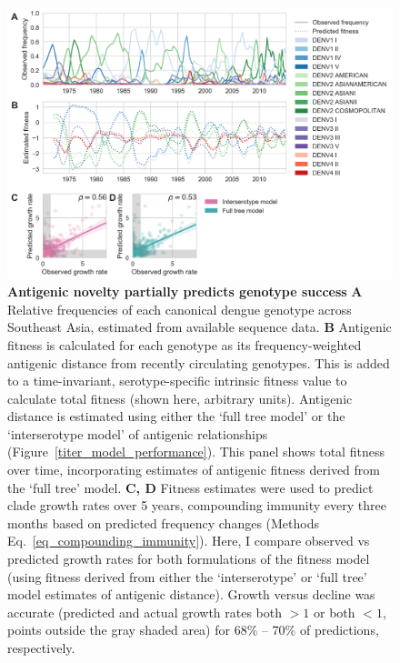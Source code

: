 \begin{figure}[ht!]
  \begin{centering}
\includegraphics[width=.9\linewidth]{./png/genotype-fitness.png}
    \caption[Antigenic novelty partially predicts genotype success]{\textbf{Antigenic novelty partially predicts genotype success }
    \textbf{A} Relative frequencies of each canonical dengue genotype across Southeast Asia, estimated from available sequence data.
    \textbf{B} Antigenic fitness is calculated for each genotype as its frequency-weighted antigenic distance from recently circulating genotypes.
    This is added to a time-invariant, serotype-specific intrinsic fitness value to calculate total fitness (shown here, arbitrary units).
    Antigenic distance is estimated using either the `full tree model' or the `interserotype model' of antigenic relationships (Figure~\ref{titer_model_performance}).
    This panel shows total fitness over time, incorporating estimates of antigenic fitness derived from the `full tree' model.
    \textbf{C, D}  Fitness estimates were used to predict clade growth rates over 5 years, compounding immunity every three months based on predicted frequency changes (Methods Eq.~\ref{eq_compounding_immunity}).
    Here, I compare observed vs predicted growth rates for both formulations of the fitness model (using fitness derived from either the `interserotype' or `full tree' model estimates of antigenic distance).
    Growth versus decline was accurate (predicted and actual growth rates both $> 1$ or both $< 1$, points outside the gray shaded area) for 68\% -- 70\% of predictions, respectively.
}
     \label{genotype_fitness}
   \end{centering}
\end{figure}

